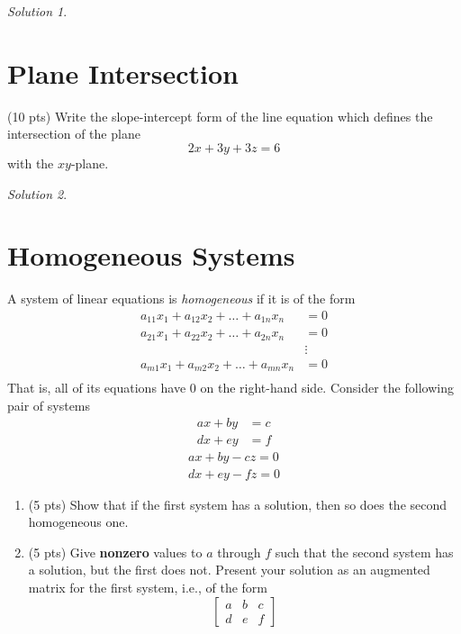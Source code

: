 \documentclass{article}
\theoremstyle{remark}
\newtheorem*{solution}{Solution}
\begin{document}
\begin{solution}
\end{solution}

\pagebreak
\section{Plane Intersection}

(10 pts) Write the slope-intercept form of the line equation which defines the intersection of the plane
\begin{displaymath}
  2x + 3y + 3z = 6
\end{displaymath}
with the $xy$-plane.

\begin{solution}
\end{solution}

\pagebreak
\section{Homogeneous Systems}

A system of linear equations is \textit{homogeneous} if it is of the form
\begin{align*}
  a_{11}x_1 + a_{12}x_2 + \dots + a_{1n}x_n &= 0\\
  a_{21}x_1 + a_{22}x_2 + \dots + a_{2n}x_n &= 0\\
  &\vdots \\
  a_{m1}x_1 + a_{m2}x_2 + \dots + a_{mn}x_n &= 0\\
\end{align*}
That is, all of its equations have $0$ on the right-hand side.
Consider the following pair of systems
\begin{align*}
  ax + by &= c \\
  dx + ey &= f
\end{align*}
\begin{align*}
  ax + by - cz = 0 \\
  dx + ey - fz = 0
\end{align*}
\begin{enumerate}
\item (5 pts) Show that if the first system has a solution, then so does the second homogeneous one.
\item (5 pts) Give \textbf{nonzero} values to $a$ through $f$ such that the second system has a solution, but the first does not. Present your solution as an augmented matrix for the first system, i.e., of the form
  \begin{displaymath}
    \begin{bmatrix}
      a & b & c \\
      d & e & f
    \end{bmatrix}
  \end{displaymath}
\end{enumerate}
\end{document}
